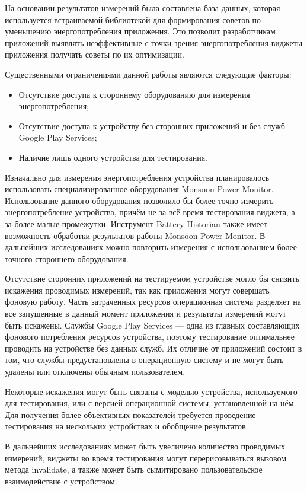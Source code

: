 \documentclass[a4paper,14pt]{extarticle} %
\begin{document}
	На основании результатов измерений была составлена база данных, которая используется встраиваемой библиотекой для формирования советов по уменьшению энергопотребления приложения. Это позволит разработчикам приложений выявлять неэффективные с точки зрения энергопотребления виджеты приложения получать советы по их оптимизации.
	
	Существенными ограничениями данной работы являются следующие факторы:
	\begin{itemize}
		\item Отсутствие доступа к стороннему оборудованию для измерения энергопотребления;
		\item Отсутствие доступа к устройству без сторонних приложений и без служб Google Play Services;
		\item Наличие лишь одного устройства для тестирования.
	\end{itemize}

	Изначально для измерения энергопотребления устройства планировалось использовать специализированное оборудования Monsoon Power Monitor. Использование данного оборудования позволило бы более точно измерить энергопотребление устройства, причём не за всё время тестирования виджета, а за более малые промежутки. Инструмент Battery Historian также имеет возможность обработки результатов работы Monsoon Power Monitor. В дальнейших исследованиях можно повторить измерения с использованием более точного стороннего оборудования.
	
	Отсутствие сторонних приложений на тестируемом устройстве могло бы снизить искажения проводимых измерений, так как приложения могут совершать фоновую работу. Часть затраченных ресурсов операционная система разделяет на все запущенные в данный момент приложения и результаты измерений могут быть искажены. Службы Google Play Services --- одна из главных составляющих фонового потребления ресурсов устройства, поэтому тестирование оптимальнее проводить на устройстве без данных служб. Их отличие от приложений состоит в том, что службы предустановлены в операционную систему и не могут быть удалены или отключены обычным пользователем.
	
	Некоторые искажения могут быть связаны с моделью устройства, используемого для тестирования, или с версией операционной системы, установленной на нём. Для получения более объективных показателей требуется проведение тестирования на нескольких устройствах и обобщение результатов.

	В дальнейших исследованиях может быть увеличено количество проводимых измерений, виджеты во время тестирования могут перерисовываться вызовом метода invalidate, а также может быть сымитировано пользовательское взаимодействие с устройством.
	
\end{document}
